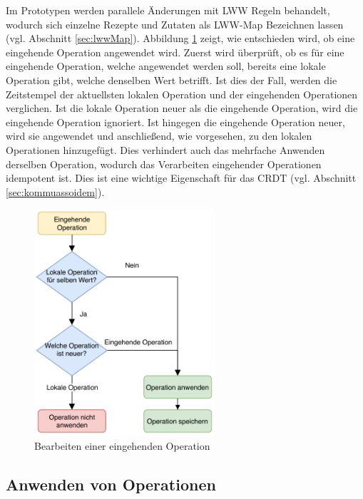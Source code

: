 \documentclass[a4paper, 12pt]{scrreprt}
\begin{document}
Im Prototypen werden parallele Änderungen mit \ac{LWW} Regeln behandelt, wodurch sich einzelne Rezepte und Zutaten als LWW-Map Bezeichnen lassen (vgl. Abschnitt \ref{sec:lwwMap}). Abbildung \ref{fig:flwochartOperationen} zeigt, wie entschieden wird, ob eine eingehende Operation angewendet wird. Zuerst wird überprüft, ob es für eine eingehende Operation, welche angewendet werden soll, bereits eine lokale Operation gibt, welche denselben Wert betrifft. Ist dies der Fall, werden die Zeitstempel der aktuellsten lokalen Operation und der eingehenden Operationen verglichen. Ist die lokale Operation neuer als die eingehende Operation, wird die eingehende Operation ignoriert. Ist hingegen die eingehende Operation neuer, wird sie angewendet und anschließend, wie vorgesehen, zu den lokalen Operationen hinzugefügt. Dies verhindert auch das mehrfache Anwenden derselben Operation, wodurch das Verarbeiten eingehender Operationen idempotent ist. Dies ist eine wichtige Eigenschaft für das CRDT (vgl. Abschnitt \ref{sec:kommuassoidem}). 

\begin{figure}[H]
	\centering
	\includegraphics[width=0.6\textwidth]{flowchartOperationen.png}
	\caption{Bearbeiten einer eingehenden Operation}
	\label{fig:flwochartOperationen}
\end{figure}

\subsection{Anwenden von Operationen}
\label{sec:anwendenOperationen}
\end{document}
